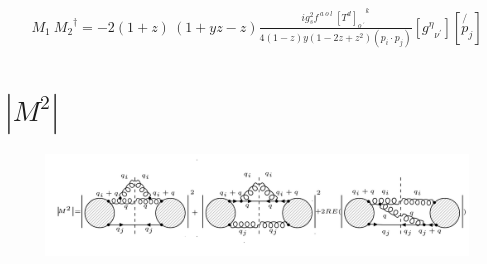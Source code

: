 \begin{equation}
\begin{split}
M_1\:{M_2}^{\dagger}=-2(1+z)\:(1+yz-z)\frac{ig_s ^2 f^{\:a\:o\:l}\: {[T^d]_{o\:^{\prime}}}^k}{4(1-z)y(1-2z+z^2)(p_i \cdot p_j)}
[{g^{{\eta}}}_{{\nu}^{\prime}}][\not{p_j}]
\end{split}
\end{equation}


\pagebreak

\section{$|M^{2}|$}
\begin{figure}[ht!]
\centering
\includegraphics[width=1.0\textwidth]{images/ggq-MSquerRE.png}

\end{figure}
